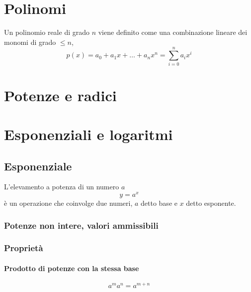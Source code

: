 \begin{definition}
\end{definition}

\section{Polinomi}
\begin{definition}[Polinomio]
Un polinomio reale di grado $n$ viene definito come una combinazione lineare dei monomi di grado $\le n$,
\begin{equation}
 p(x) = a_0 + a_1 x + \dots + a_n x^n = \sum_{i=0}^{n} a_i x^i
\end{equation}
\end{definition}

\section{Potenze e radici}
\begin{definition}
\end{definition}

\section{Esponenziali e logaritmi}
\subsection{Esponenziale}
\begin{definition}[Esponenziale] L'elevamento a potenza di un numero $a$
\begin{equation}
   y = a^x
\end{equation}
è un operazione che coinvolge due numeri, $a$ detto base e $x$ detto esponente.
\end{definition}
\subsubsection{Potenze non intere, valori ammissibili}
\subsubsection{Proprietà}
\paragraph{Prodotto di potenze con la stessa base}
\begin{equation} a^m a^n = a^{m+n} \end{equation}
